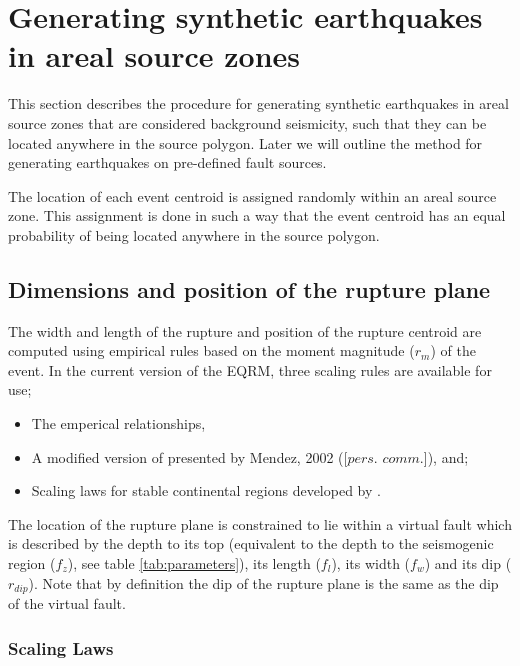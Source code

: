 \section{Generating synthetic earthquakes in areal source zones}
\label{sec:areal_gen}

This section describes the procedure for generating synthetic earthquakes in areal source zones that are considered background seismicity, such that they can be located
anywhere in the source polygon. Later we will outline the method for generating earthquakes on pre-defined fault sources. 

The location of each event centroid is assigned randomly within an areal source zone. 
This assignment is done in such a way that the event centroid has
an equal probability of being located anywhere in the source
polygon. 


\subsection{Dimensions and position of the rupture plane}
\label{sec:dim-rupture}

The width and length of the rupture and position of the rupture
centroid are computed using empirical
rules based on the moment magnitude ($r_m$) of the event. In the current version of the EQRM, three scaling 
rules are available for use; 
\begin{itemize}
\item The \citet{eqrm_Wells94} emperical relationships, 
\item A modified version of \citet{eqrm_Wells94} presented by Mendez, 2002 ([$\textit{pers. comm.}$]), and; 
\item Scaling laws for stable continental regions developed by \citet{eqrm_Leonard10}.
\end{itemize}

The location of the rupture plane
is constrained to lie within a virtual fault
which is described by the depth to its top (equivalent to the
depth to the seismogenic region ($f_z$), see
table \ref{tab:parameters}), its length ($f_l$), its width
($f_w$) and its dip ($r_{dip}$). Note that by definition the dip of the
 rupture plane is the same as the dip of the virtual fault. 

\subsubsection{\citep{eqrm_Wells94} Scaling Laws}

